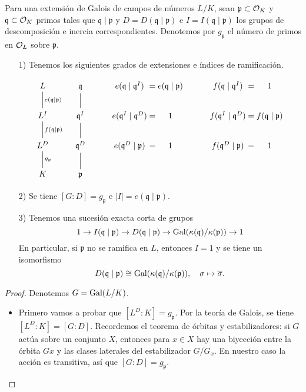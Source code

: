\begin{teorema}
  Para una extensión de Galois de campos de números $L/K$, sean
  $\mathfrak{p} \subset \mathcal{O}_K$ y $\mathfrak{q} \subset \mathcal{O}_K$ primos tales que
  $\mathfrak{q}\mid\mathfrak{p}$ y $D = D (\mathfrak{q}\mid\mathfrak{p})$
  e $I = I (\mathfrak{q} \mid \mathfrak{p})$ los grupos de descomposición
  e inercia correspondientes. Denotemos por $g_\mathfrak{p}$ el número de primos
  en $\mathcal{O}_L$ sobre $\mathfrak{p}$.

  \begin{enumerate}
  \item[1)] Tenemos los siguientes grados de extensiones e índices de
    ramificación.

    \[ \begin{tikzcd}
      L \ar[-]{d}{e (\mathfrak{q}\mid\mathfrak{p})} & \mathfrak{q} \ar[-]{d} & e (\mathfrak{q}\mid\mathfrak{q}^I) &[-3em] = &[-3em] e (\mathfrak{q}\mid\mathfrak{p}) & f (\mathfrak{q}\mid\mathfrak{q}^I) &[-3em] = &[-3em] 1 \\
      L^I \ar[-]{d}{f (\mathfrak{q}\mid\mathfrak{p})} & \mathfrak{q}^I \ar[-]{d} & e (\mathfrak{q}^I\mid\mathfrak{q}^D) & = & 1 & f (\mathfrak{q}^I\mid\mathfrak{q}^D) & = & f (\mathfrak{q}\mid\mathfrak{p}) \\
      L^D \ar[-]{d}{g_\mathfrak{p}} & \mathfrak{q}^D \ar[-]{d} & e (\mathfrak{q}^D\mid\mathfrak{p}) & = & 1 & f (\mathfrak{q}^D\mid\mathfrak{p}) & = & 1 \\
      K & \mathfrak{p}
    \end{tikzcd} \]

  \item[2)] Se tiene $[G : D] = g_\mathfrak{p}$ e
    $|I| = e (\mathfrak{q}\mid\mathfrak{p})$.

  \item[3)] Tenemos una sucesión exacta corta de grupos
    \[ 1 \to I (\mathfrak{q}\mid\mathfrak{p}) \to
    D (\mathfrak{q}\mid\mathfrak{p}) \to
    \operatorname{Gal} (\kappa(\mathfrak{q})/\kappa(\mathfrak{p})) \to 1 \]
    En particular, si $\mathfrak{p}$ no se ramifica en $L$, entonces $I = 1$
    y se tiene un isomorfismo
    \[ D (\mathfrak{q}\mid\mathfrak{p}) \cong
    \operatorname{Gal} (\kappa(\mathfrak{q})/\kappa(\mathfrak{p})), \quad
    \sigma \mapsto \overline{\sigma}. \]
  \end{enumerate}

  \begin{proof}
    Denotemos $G = \operatorname{Gal} (L/K)$.

    \begin{itemize}
      \item Primero vamos a probar que $[L^D : K] = g_\mathfrak{p}$. Por la
        teoría de Galois, se tiene $[L^D : K] = [G : D]$. Recordemos el
        teorema de órbitas y estabilizadores: si $G$ actúa sobre un conjunto
        $X$, entonces para $x \in X$ hay una biyección entre la órbita $Gx$ y
        las clases laterales del estabilizador $G/G_x$. En nuestro caso la
        acción es transitiva, así que $[G : D] = g_\mathfrak{p}$.


\end{itemize}
\end{proof}
\end{teorema}
